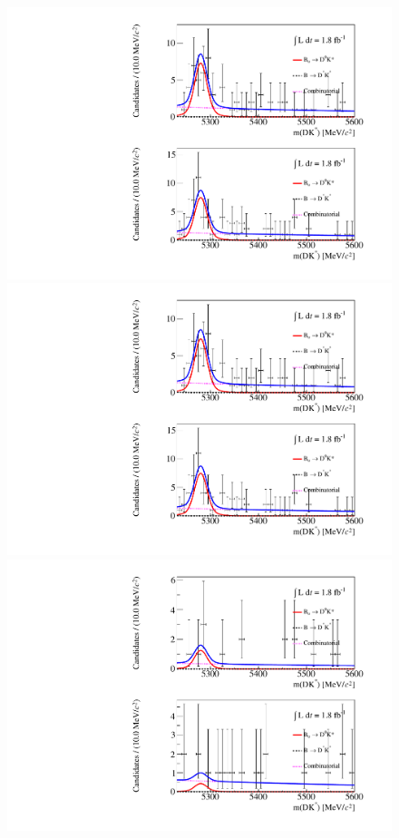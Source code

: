 \begin{figure}
\includegraphics[trim = 0 0.5\imageheight{} 0 0,clip,width=0.5\linewidth]{figures/results/canvas_d2pipipipi_DD_run2.pdf}
\includegraphics[trim = 0 0 0 0.5\imageheight{},clip,width=0.5\linewidth]{figures/results/canvas_d2pipipipi_DD_run2.pdf}
\hfill
{}
\includegraphics[trim = 0 0.5\imageheight{} 0 0,clip,width=0.5\linewidth]{figures/results/canvas_d2pikpipi_DD_run2.pdf}

\end{figure}
